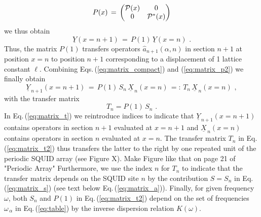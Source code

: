 %
\begin{equation} \label{eq:matrix_p2}
P(x) \, = \, 
\begin{pmatrix}
{\cal P}(x) & 0 \\
0 & {\cal P}^*(x) \\
\end{pmatrix}
\end{equation}
%
we thus obtain
%
\begin{equation} \label{eq:matrix_ypy}
\underline{Y}(x=n+1) \, = \, P(1) \, \underline Y(x=n) \, \, .
\end{equation}
%
Thus, the matrix $P(1)$ transfers operators $\hat{a}_{n+1}(\alpha,n)$ in
section $n+1$ at position $x=n$ to position $n+1$ corresponding to a displacement of 
1 lattice constant $\ell$. 
Combining Eqs.\,(\ref{eq:matrix_compact}) and (\ref{eq:matrix_p2}) 
we finally obtain
%
\begin{equation} \label{eq:matrix_t}
\underline{Y}_{\, n+1}(x=n+1) \, = \, P(1) \, S_n \, \underline{X}_{\,n}(x=n) \, =: \, T_n \, \underline{X}_{\,n}(x=n) \, \, ,
\end{equation}
%
with the transfer matrix 
%
\begin{equation} \label{eq:matrix_t2}
T_n = P(1) \, S_n \, \, .
\end{equation}
%
In Eq.\,(\ref{eq:matrix_t}) we reintroduce indices to indicate that 
$\underline{Y}_{\, n+1}(x=n+1)$ contains operators in section $n+1$ evaluated at $x=n+1$
and $\underline{X}_{\,n}(x=n)$
contains operators in section $n$ evaluated at $x=n$. 
The transfer matrix $T_n$ in Eq.\,(\ref{eq:matrix_t2}) thus transfers the latter 
to the right by one repeated unit of the periodic SQUID array
%
\color{red}
(see Figure X). Make Figure like that on page 21 of "Periodic Array"
\color{black}
%
Furthermore, we use the index $n$ for $T_n$ to indicate that the transfer matrix
depends on the SQUID site $n$ by the contribution $S = S_n$ in Eq.\,(\ref{eq:matrix_s}) 
(see text below Eq.\,(\ref{eq:matrix_a})).  
Finally, for given frequency $\omega$, both $S_n$ and $P(1)$ in Eq.\,(\ref{eq:matrix_t2}) 
depend on the set of frequencies $\omega_{\,\alpha}$ in Eq.\,(\ref{eq:table}) by the inverse 
dispersion relation $K(\omega)$. 

